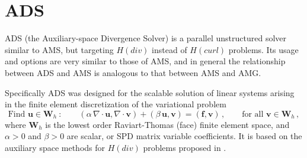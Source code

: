 \section{ADS}
\label{ADS}

ADS (the Auxiliary-space Divergence Solver) is a parallel unstructured solver
similar to AMS, but targeting $H(div)$ instead of $H(curl)$ problems. Its usage
and options are very similar to those of AMS, and in general the relationship
between ADS and AMS is analogous to that between AMS and AMG.

Specifically ADS was designed for the scalable solution of linear systems
arising in the finite element discretization of the variational problem
\begin{equation} \label{ads-hdiv}
\mbox{Find } {\mathbf u} \in {\mathbf W}_h \>:\qquad
(\alpha\, \nabla \cdot {\mathbf u},  \nabla \cdot {\mathbf v}) +
(\beta\, {\mathbf u},  {\mathbf v}) = ({\mathbf f},  {\mathbf v})\,,
\qquad \mbox{for all } {\mathbf v} \in {\mathbf W}_h \,,
\end{equation}
where ${\mathbf W}_h$ is the lowest order Raviart-Thomas (face) finite element
space, and $\alpha>0$ and $\beta>0$ are scalar, or SPD matrix variable
coefficients.  It is based on the auxiliary space methods for $H(div)$ problems
proposed in \cite{xu_H_curl}.

